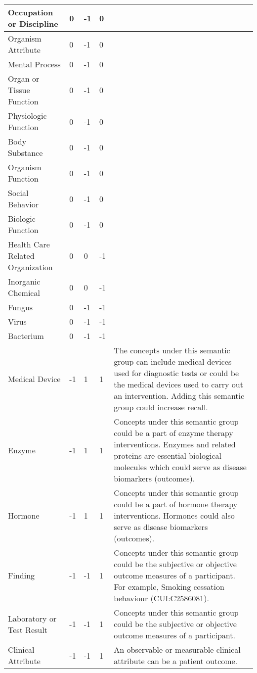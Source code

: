 \documentclass[10.7pt,]{article}
\begin{document}
\begin{longtable}{|l|p{0.3cm}|p{0.3cm}|p{0.3cm}|p{7.9cm}|}
        Occupation or Discipline & 0 & -1 & 0 & ~ \\ \hline
        Organism Attribute & 0 & -1 & 0 & ~ \\ \hline
        Mental Process & 0 & -1 & 0 & ~ \\ \hline
        Organ or Tissue Function & 0 & -1 & 0 & ~ \\ \hline
        Physiologic Function & 0 & -1 & 0 & ~ \\ \hline
        Body Substance & 0 & -1 & 0 & ~ \\ \hline
        Organism Function & 0 & -1 & 0 & ~ \\ \hline
        Social Behavior & 0 & -1 & 0 & ~ \\ \hline
        Biologic Function & 0 & -1 & 0 & ~ \\ \hline
        Health Care Related Organization & 0 & 0 & -1 & ~ \\ \hline
        Inorganic Chemical & 0 & 0 & -1 & ~ \\ \hline
        Fungus & 0 & -1 & -1 & ~ \\ \hline
        Virus & 0 & -1 & -1 & ~ \\ \hline
        Bacterium & 0 & -1 & -1 & ~ \\ \hline
        Medical Device & -1 & 1 & 1 & The concepts under this semantic group can include medical devices used for diagnostic tests or could be the medical devices used to carry out an intervention. Adding this semantic group could increase recall. \\ \hline
        Enzyme & -1 & 1 & 1 & Concepts under this semantic group could be a part of enzyme therapy interventions. Enzymes and related proteins are essential biological molecules which could serve as disease biomarkers (outcomes). \\ \hline
        Hormone & -1 & 1 & 1 & Concepts under this semantic group could be a part of hormone therapy interventions. Hormones could also serve as disease biomarkers (outcomes). \\ \hline
        Finding & -1 & -1 & 1 & Concepts under this semantic group could be the subjective or objective outcome measures of a participant. For example, Smoking cessation behaviour (CUI:C2586081). \\ \hline
        Laboratory or Test Result & -1 & -1 & 1 & Concepts under this semantic group could be the subjective or objective outcome measures of a participant. \\ \hline
        Clinical Attribute & -1 & -1 & 1 & An observable or measurable clinical attribute can be a patient outcome. \\ \hline

\end{longtable}
\end{document}
